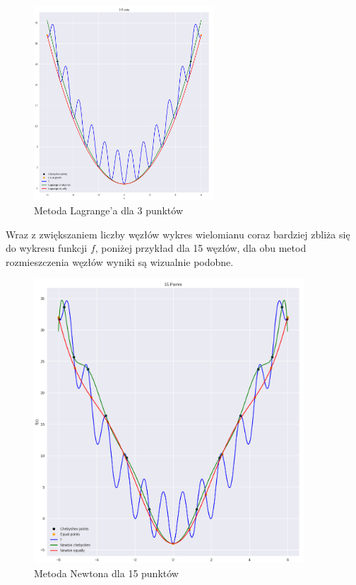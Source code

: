 \documentclass{article}
\begin{document}
\begin{figure}[H]
    \centering
    \includegraphics[width=0.6\textwidth]{img/lagr_3.png}
    \caption{Metoda Lagrange'a dla 3 punktów}
\end{figure}

Wraz z zwiększaniem liczby węzłów wykres wielomianu coraz bardziej zbliża się do wykresu funkcji $f$, 
poniżej przykład dla 15 węzłów, dla obu metod rozmieszczenia węzłów wyniki są wizualnie podobne.

\begin{figure}[H]
    \centering
    \includegraphics[width=0.9\textwidth]{img/newt_15.png}
    \caption{Metoda Newtona dla 15 punktów}
\end{figure}
\end{document}

